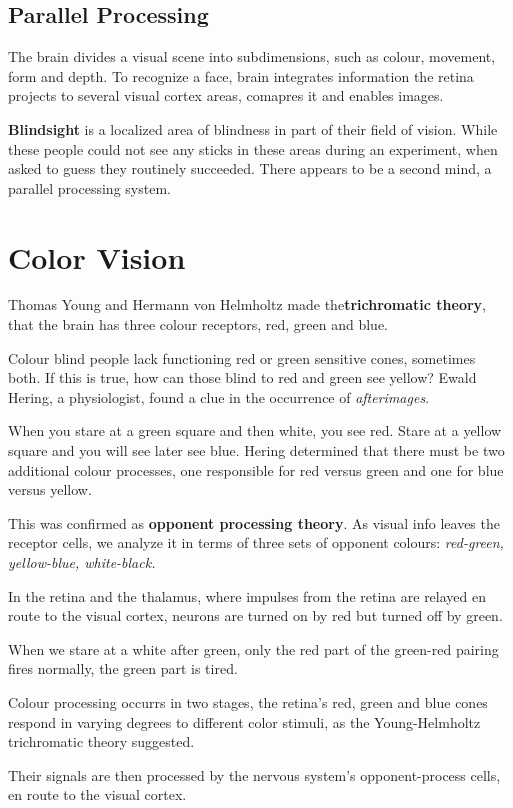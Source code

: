 \documentclass[12pt]{article}
\begin{document}
\subsection*{Parallel Processing}
The brain divides a visual scene into subdimensions, such as colour, movement, form and depth. To recognize a face, brain integrates information the retina projects to several visual cortex areas, comapres it and enables images. 

\textbf{Blindsight} is a localized area of blindness in part of their field of vision. While these people could not see any sticks in these areas during an experiment, when asked to guess they routinely succeeded. There appears to be a second mind, a parallel processing system.

\section*{Color Vision}
Thomas Young and Hermann von Helmholtz made the\textbf{trichromatic theory}, that the brain has three colour receptors, red, green and blue.

Colour blind people lack functioning red or green sensitive cones, sometimes both. If this is true, how can those blind to red and green see yellow? Ewald Hering, a physiologist, found a clue in the occurrence of \textit{afterimages}. 

When you stare at a green square and then white, you see red. Stare at a yellow square and you will see later see blue. Hering determined that there must be two additional colour processes, one responsible for red versus green and one for blue versus yellow.

This was confirmed as \textbf{opponent processing theory}. As visual info leaves the receptor cells, we analyze it in terms of three sets of opponent colours: \textit{red-green, yellow-blue, white-black.}

In the retina and the thalamus, where impulses from the retina are relayed en route to the visual cortex, neurons are turned on by red but turned off by green. 

When we stare at a white after green, only the red part of the green-red pairing fires normally, the green part is tired.

Colour processing occurrs in two stages, the retina's red, green and blue cones respond in varying degrees to different color stimuli, as the Young-Helmholtz trichromatic theory suggested.

Their signals are then processed by the nervous system's opponent-process cells, en route to the visual cortex.
\end{document}
